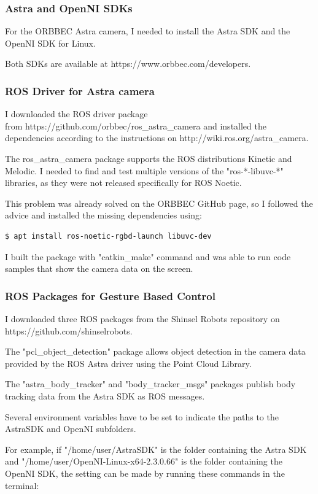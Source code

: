 \subsubsection{Astra and OpenNI SDKs}
For the ORBBEC Astra camera, I needed to install the Astra SDK and the OpenNI SDK for Linux.\par
Both SDKs are available at https://www.orbbec.com/developers.\par

\subsubsection{ROS Driver for Astra camera}
I downloaded the ROS driver package\\
from https://github.com/orbbec/ros\_astra\_camera and installed the dependencies according to the instructions on http://wiki.ros.org/astra\_camera.\par
The ros\_astra\_camera package supports the ROS distributions Kinetic and Melodic. I needed to find and test multiple versions of the "ros-*-libuvc-*" libraries, as they were not released specifically for ROS Noetic.\par
This problem was already solved on the ORBBEC GitHub page, so I followed the advice and installed the missing dependencies using:\par

\begin{lstlisting}[language=bash]
  $ apt install ros-noetic-rgbd-launch libuvc-dev
\end{lstlisting}


I built the package with "catkin\_make" command and was able to run code samples that show the camera data on the screen.\par

\subsubsection{ROS Packages for Gesture Based Control}
I downloaded three ROS packages from the Shinsel Robots repository on https://github.com/shinselrobots.\par
The "pcl\_object\_detection" package allows object detection in the camera data provided by the ROS Astra driver using the Point Cloud Library.\par
The "astra\_body\_tracker" and "body\_tracker\_msgs" packages publish body tracking data from the Astra SDK as ROS messages.\par
Several environment variables have to be set to indicate the paths to the AstraSDK and OpenNI subfolders.\par
For example, if "/home/user/AstraSDK" is the folder containing the Astra SDK and "/home/user/OpenNI-Linux-x64-2.3.0.66" is the folder containing the OpenNI SDK, the setting can be made by running these commands in the terminal: \par

